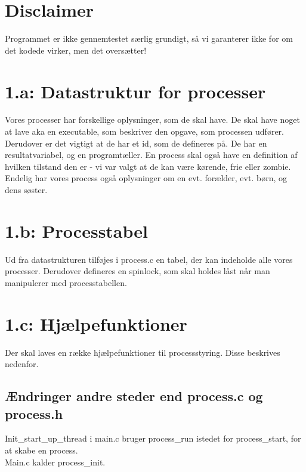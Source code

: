 \documentclass[10pt,a4paper,danish]{article}
\title{}
\author{Maria Caroline Miller, 040779, twq135 \\ Søren Pilgård, 190689, vpb984}
\begin{document}
\maketitle
\newpage


\section{Disclaimer}
Programmet er ikke gennemtestet særlig grundigt, så vi garanterer ikke for om det kodede virker, men det oversætter!

\section{1.a: Datastruktur for processer}
Vores processer har forskellige oplysninger, som de skal have. De skal have noget at lave aka en executable, som beskriver den opgave, som processen udfører. Derudover er det vigtigt at de har et id, som de defineres på. De har en resultatvariabel, og en programtæller. En process skal også have en definition af hvilken tilstand den er - vi var valgt at de kan være kørende, frie eller zombie. Endelig har vores process også oplysninger om en evt. forælder, evt. børn, og dens søster.

\section{1.b: Processtabel}
Ud fra datastrukturen tilføjes i process.c en tabel, der kan indeholde alle vores processer. Derudover defineres en spinlock, som skal holdes låst når man manipulerer med processtabellen.

\section{1.c: Hjælpefunktioner}
Der skal laves en række hjælpefunktioner til processstyring. Disse beskrives nedenfor. 

\subsection{Ændringer andre steder end process.c og process.h}
Init\_start\_up\_thread i main.c bruger process\_run istedet for process\_start, for at skabe en process.\\

Main.c kalder process\_init.\\
\end{document}
